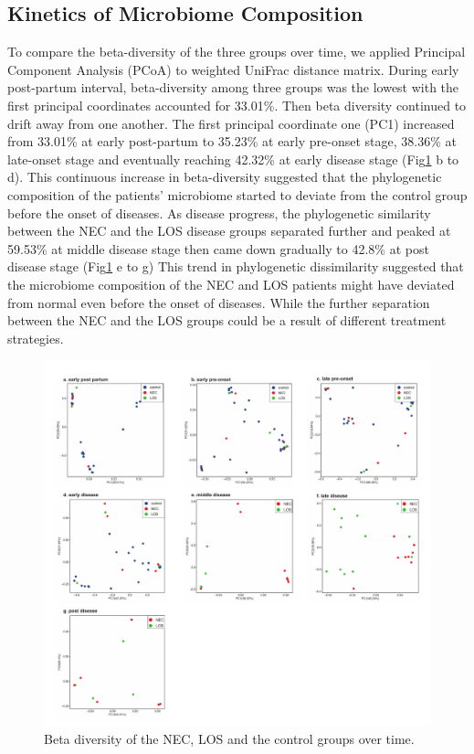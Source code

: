 \documentclass[fleqn,10pt]{wlpeerj} %
\begin{document}
    \subsection*{Kinetics of Microbiome Composition}
    To compare the beta-diversity of the three groups over time, we applied Principal Component Analysis (PCoA) to weighted UniFrac distance matrix.
    During early post-partum interval, beta-diversity among three groups was the lowest with the first principal coordinates accounted for 33.01\%. Then beta diversity continued to drift away from one another. The first principal coordinate one (PC1) increased from 33.01\% at early post-partum to 35.23\% at early pre-onset stage, 38.36\% at late-onset stage and eventually reaching 42.32\% at early disease stage (Fig\ref{fig:pcoa} b to d).  This continuous increase in beta-diversity suggested that the phylogenetic composition of the patients’ microbiome started to deviate from the control group before the onset of diseases. As disease progress, the phylogenetic similarity between the NEC and the LOS disease groups separated further and peaked at 59.53\% at middle disease stage then came down gradually to 42.8\% at post disease stage (Fig\ref{fig:pcoa} e to g) This trend in phylogenetic dissimilarity suggested that the microbiome composition of the NEC and LOS patients might have deviated from normal even before the onset of diseases.  While the further separation between the NEC and the LOS groups could be a result of different treatment strategies.
    \begin{figure}[ht]\centering
      \includegraphics[width=\linewidth]{figure/pcoa_time_group.pdf}
      \caption{Beta diversity of the NEC, LOS and the control groups over time.}
      \label{fig:pcoa}
    \end{figure}
\end{document}
